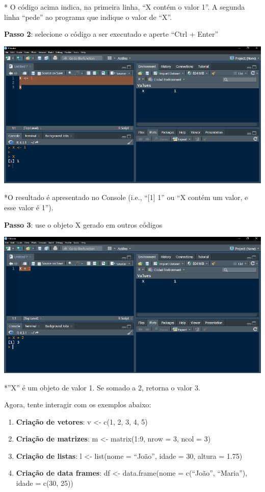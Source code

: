 \documentclass[
]{book}
\begin{document}
* O código acima indica, na primeira linha, ``X contém o valor 1''. A segunda linha ``pede'' ao programa que indique o valor de ``X''.

\textbf{Passo 2}: selecione o código a ser executado e aperte ``Ctrl + Enter''

\includegraphics{images/clipboard-2485386777.png}

*O resultado é apresentado no Console (i.e., ``{[}1{]} 1'' ou ``X contém um valor, e esse valor é 1'').

\textbf{Passo 3}: use o objeto X gerado em outros códigos

\includegraphics{images/clipboard-3669577123.png}

*''X'' é um objeto de valor 1. Se somado a 2, retorna o valor 3.

Agora, tente interagir com os exemplos abaixo:

\begin{enumerate}
\def\labelenumi{\arabic{enumi}.}
\item
  \textbf{Criação de vetores}: v \textless- c(1, 2, 3, 4, 5)
\item
  \textbf{Criação de matrizes}: m \textless- matrix(1:9, nrow = 3, ncol = 3)
\item
  \textbf{Criação de listas}: l \textless- list(nome = ``João'', idade = 30, altura = 1.75)
\item
  \textbf{Criação de data frames}: df \textless- data.frame(nome = c(``João'', ``Maria''), idade = c(30, 25))
\end{enumerate}
\end{document}
